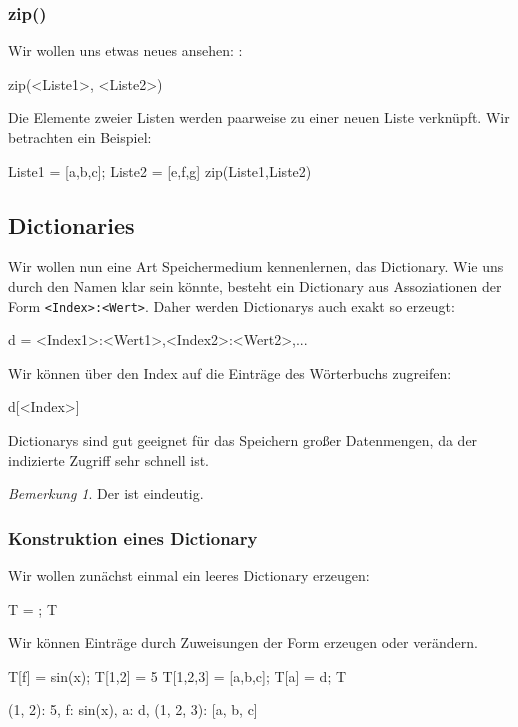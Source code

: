 \documentclass[fontsize=12pt,paper=a4,twoside,bibtotoc,idxtotoc,
liststotoc,pagesize,BCOR1.2cm,DIV15,chapterprefix,pagesize=pdftex]{scrbook}
\theoremstyle{plain}
\theoremstyle{definition}
\theoremstyle{remark}
\newtheorem{bem}[equation]{Bemerkung}
\begin{document}
\subsubsection{zip()}
Wir wollen uns etwas neues ansehen: :
\begin{sagein}
zip(<Liste1>, <Liste2>) 
\end{sagein}
Die Elemente zweier Listen werden paarweise zu einer neuen Liste verknüpft.
Wir betrachten ein Beispiel:
\begin{sagein}
Liste1 = [a,b,c]; Liste2 = [e,f,g]
zip(Liste1,Liste2)
\end{sagein}
\begin{sage}
[(a, e), (b, f), (c, g)]
\end{sage}

\subsection{Dictionaries}
Wir wollen nun eine Art Speichermedium kennenlernen, das Dictionary. Wie uns durch den Namen klar sein könnte, besteht ein Dictionary aus Assoziationen der Form \verb+<Index>:<Wert>+. 
Daher werden Dictionarys auch exakt so erzeugt:
\begin{sagein}
d = {<Index1>:<Wert1>,<Index2>:<Wert2>,...}
\end{sagein}
Wir können über den Index auf die Einträge des Wörterbuchs zugreifen:
\begin{sagein}
d[<Index>]
\end{sagein}
Dictionarys sind gut geeignet für das Speichern großer Datenmengen, da der indizierte Zugriff sehr schnell ist.
\begin{bem}
 Der  ist eindeutig.
\end{bem}
\subsubsection{Konstruktion eines Dictionary}
Wir wollen zunächst einmal ein leeres Dictionary erzeugen:
\begin{sagein}
T = {}; T
\end{sagein}
\begin{sage}
  {}
\end{sage}
Wir können Einträge durch Zuweisungen der Form  erzeugen oder verändern. 
\begin{sagein}
T[f] = sin(x); T[1,2] = 5
T[1,2,3] = [a,b,c]; T[a] = d;
T
\end{sagein}
\begin{sage}
{(1, 2): 5, f: sin(x), a: d, (1, 2, 3): [a, b, c]}
\end{sage}
\end{document}
